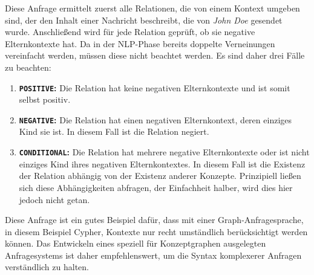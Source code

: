 \inputminted{cypher}{data/evaluation/personNegationAction.cql}
Diese Anfrage ermittelt zuerst alle Relationen, die von einem Kontext umgeben sind, der den Inhalt einer Nachricht beschreibt, die von \textit{John Doe} gesendet wurde.
Anschließend wird für jede Relation geprüft, ob sie negative Elternkontexte hat.
Da in der NLP-Phase bereits doppelte Verneinungen vereinfacht werden, müssen diese nicht beachtet werden.
Es sind daher drei Fälle zu beachten:
\begin{enumerate}
	\item \textbf{\texttt{POSITIVE}:}
		Die Relation hat keine negativen Elternkontexte und ist somit selbst positiv.
	\item \textbf{\texttt{NEGATIVE}:}
		Die Relation hat einen negativen Elternkontext, deren einziges Kind sie ist.
		In diesem Fall ist die Relation negiert.
	\item \textbf{\texttt{CONDITIONAL}:}
		Die Relation hat mehrere negative Elternkontexte oder ist nicht einziges Kind ihres negativen Elternkontextes.
		In diesem Fall ist die Existenz der Relation abhängig von der Existenz anderer Konzepte.
		Prinzipiell ließen sich diese Abhängigkeiten abfragen, der Einfachheit halber, wird dies hier jedoch nicht getan.
\end{enumerate}
Diese Anfrage ist ein gutes Beispiel dafür, dass mit einer Graph-Anfragesprache, in diesem Beispiel Cypher, Kontexte nur recht umständlich berücksichtigt werden können.
Das Entwickeln eines speziell für Konzeptgraphen ausgelegten Anfragesystems ist daher empfehlenswert, um die Syntax komplexerer Anfragen verständlich zu halten.

